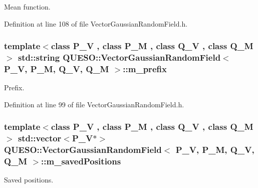 Mean function. 



Definition at line 108 of file Vector\-Gaussian\-Random\-Field.\-h.

\hypertarget{class_q_u_e_s_o_1_1_vector_gaussian_random_field_a1adeb7ad40609acaa8a5e47b19026e36}{
\subsubsection[{m\-\_\-prefix}]{\setlength{\rightskip}{0pt plus 5cm}template$<$class P\-\_\-\-V , class P\-\_\-\-M , class Q\-\_\-\-V , class Q\-\_\-\-M $>$ std\-::string {\bf Q\-U\-E\-S\-O\-::\-Vector\-Gaussian\-Random\-Field}$<$ P\-\_\-\-V, P\-\_\-\-M, Q\-\_\-\-V, Q\-\_\-\-M $>$\-::m\-\_\-prefix\hspace{0.3cm}{\ttfamily [protected]}}}\label{class_q_u_e_s_o_1_1_vector_gaussian_random_field_a1adeb7ad40609acaa8a5e47b19026e36}


Prefix. 



Definition at line 99 of file Vector\-Gaussian\-Random\-Field.\-h.

\hypertarget{class_q_u_e_s_o_1_1_vector_gaussian_random_field_aa51f310fb54dd4807522a0e72be61acd}{
\subsubsection[{m\-\_\-saved\-Positions}]{\setlength{\rightskip}{0pt plus 5cm}template$<$class P\-\_\-\-V , class P\-\_\-\-M , class Q\-\_\-\-V , class Q\-\_\-\-M $>$ std\-::vector$<$P\-\_\-\-V$\ast$$>$ {\bf Q\-U\-E\-S\-O\-::\-Vector\-Gaussian\-Random\-Field}$<$ P\-\_\-\-V, P\-\_\-\-M, Q\-\_\-\-V, Q\-\_\-\-M $>$\-::m\-\_\-saved\-Positions\hspace{0.3cm}{\ttfamily [protected]}}}\label{class_q_u_e_s_o_1_1_vector_gaussian_random_field_aa51f310fb54dd4807522a0e72be61acd}


Saved positions. 



